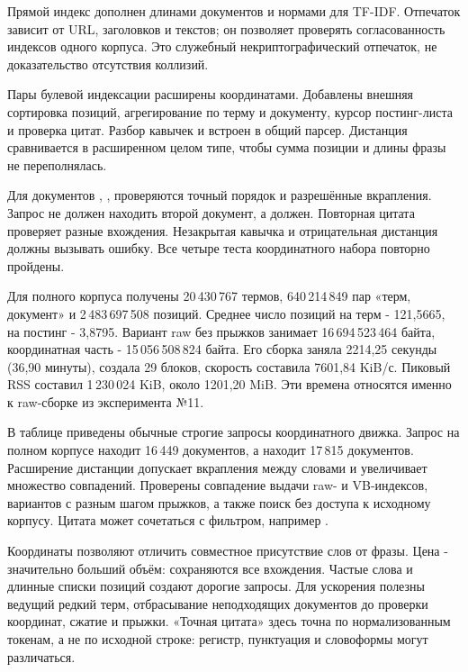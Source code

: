 Прямой индекс дополнен длинами документов и нормами для TF-IDF.
Отпечаток зависит от URL, заголовков и текстов; он позволяет
проверять согласованность индексов одного корпуса. Это служебный
некриптографический отпечаток, не доказательство отсутствия коллизий.

\journal
Пары булевой индексации расширены координатами. Добавлены внешняя
сортировка позиций, агрегирование по терму и документу, курсор
постинг-листа и проверка цитат. Разбор кавычек и 
встроен в общий парсер. Дистанция сравнивается в расширенном
целом типе, чтобы сумма позиции и длины фразы не переполнялась.

\testing
Для документов , ,
 проверяются точный порядок и разрешённые
вкрапления. Запрос  не должен находить второй
документ, а  должен. Повторная цитата
 проверяет разные вхождения. Незакрытая
кавычка и отрицательная дистанция должны вызывать ошибку.
Все четыре теста координатного набора повторно пройдены.

\results
Для полного корпуса получены 20\,430\,767 термов,
640\,214\,849 пар «терм, документ» и 2\,483\,697\,508 позиций.
Среднее число позиций на терм - 121,5665, на постинг - 3,8795.
Вариант raw без прыжков занимает 16\,694\,523\,464 байта,
координатная часть - 15\,056\,508\,824 байта. Его
сборка заняла 2214,25 секунды (36,90 минуты), создала 29 блоков,
скорость составила 7601,84 KiB/с. Пиковый RSS составил
1\,230\,024 KiB, около 1201,20 MiB. Эти времена относятся именно
к raw-сборке из эксперимента №11.


В таблице приведены обычные строгие запросы координатного движка.
Запрос  на полном корпусе находит
16\,449 документов, а  находит
17\,815 документов. Расширение дистанции допускает вкрапления
между словами и увеличивает множество совпадений.
Проверены совпадение выдачи raw- и VB-индексов, вариантов с разным
шагом прыжков, а также поиск без доступа к исходному корпусу.
Цитата может сочетаться с фильтром, например
.

\conclusions
Координаты позволяют отличить совместное присутствие слов от фразы.
Цена - значительно больший объём: сохраняются все вхождения.
Частые слова и длинные списки позиций создают дорогие запросы.
Для ускорения полезны ведущий редкий терм, отбрасывание неподходящих
документов до проверки координат, сжатие и прыжки. «Точная цитата»
здесь точна по нормализованным токенам, а не по исходной строке:
регистр, пунктуация и словоформы могут различаться.

